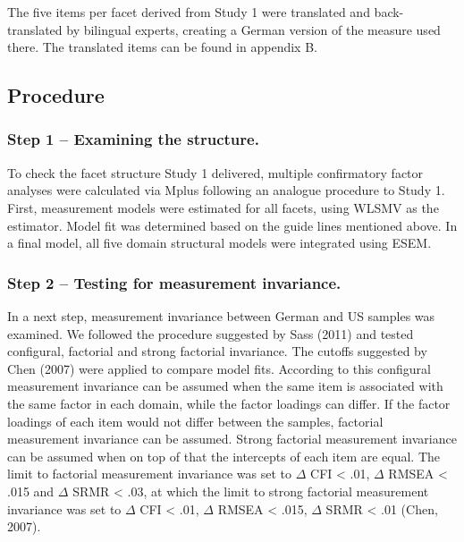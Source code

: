 \documentclass[,man,floatsintext]{apa6}
\theoremstyle{definition}
\theoremstyle{definition}
\theoremstyle{definition}
\theoremstyle{remark}
\begin{document}
The five items per facet derived from Study 1 were translated and
back-translated by bilingual experts, creating a German version of the
measure used there. The translated items can be found in appendix B.

\hypertarget{procedure-1}{%
\subsection{Procedure}\label{procedure-1}}

\hypertarget{step-1-examining-the-structure.}{%
\subsubsection{Step 1 -- Examining the
structure.}\label{step-1-examining-the-structure.}}

To check the facet structure Study 1 delivered, multiple confirmatory
factor analyses were calculated via Mplus following an analogue
procedure to Study 1. First, measurement models were estimated for all
facets, using WLSMV as the estimator. Model fit was determined based on
the guide lines mentioned above. In a final model, all five domain
structural models were integrated using ESEM.

\hypertarget{step-2-testing-for-measurement-invariance.}{%
\subsubsection{Step 2 -- Testing for measurement
invariance.}\label{step-2-testing-for-measurement-invariance.}}

In a next step, measurement invariance between German and US samples was
examined. We followed the procedure suggested by Sass (2011) and tested
configural, factorial and strong factorial invariance. The cutoffs
suggested by Chen (2007) were applied to compare model fits. According
to this configural measurement invariance can be assumed when the same
item is associated with the same factor in each domain, while the factor
loadings can differ. If the factor loadings of each item would not
differ between the samples, factorial measurement invariance can be
assumed. Strong factorial measurement invariance can be assumed when on
top of that the intercepts of each item are equal. The limit to
factorial measurement invariance was set to \(\Delta\) CFI \textless{}
.01, \(\Delta\) RMSEA \textless{} .015 and \(\Delta\) SRMR \textless{}
.03, at which the limit to strong factorial measurement invariance was
set to \(\Delta\) CFI \textless{} .01, \(\Delta\) RMSEA \textless{}
.015, \(\Delta\) SRMR \textless{} .01 (Chen, 2007).
\end{document}
